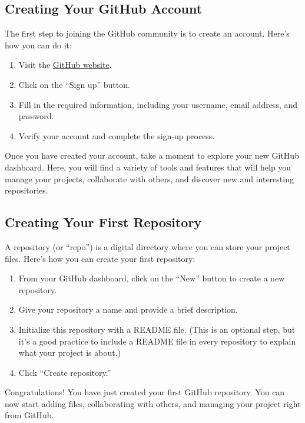 \documentclass[a4paper,12pt]{book}
\begin{document}
\subsection*{Creating Your GitHub Account}

The first step to joining the GitHub community is to create an account. Here’s how you can do it:

\begin{enumerate}
    \item Visit the \href{https://github.com/}{GitHub website}.
    \item Click on the “Sign up” button.
    \item Fill in the required information, including your username, email address, and password.
    \item Verify your account and complete the sign-up process.
\end{enumerate}

Once you have created your account, take a moment to explore your new GitHub dashboard. Here, you will find a variety of tools and features that will help you manage your projects, collaborate with others, and discover new and interesting repositories.

\subsection*{Creating Your First Repository}

A repository (or “repo”) is a digital directory where you can store your project files. Here’s how you can create your first repository:

\begin{enumerate}
    \item From your GitHub dashboard, click on the “New” button to create a new repository.
    \item Give your repository a name and provide a brief description.
    \item Initialize this repository with a README file. (This is an optional step, but it’s a good practice to include a README file in every repository to explain what your project is about.)
    \item Click “Create repository.”
\end{enumerate}

Congratulations! You have just created your first GitHub repository. You can now start adding files, collaborating with others, and managing your project right from GitHub.
\end{document}
